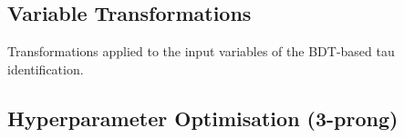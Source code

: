 \subsection{Variable Transformations}
\label{app:variable_transforms}

\begin{table}[htb]
  \centering
  {\def\arraystretch{1.35}\small
    
  }
  \caption[Transformations applied to input the variables of the BDT-based tau
  identification]{Transformations applied to the input variables of the
    BDT-based tau identification.}
\end{table}

\clearpage
\subsection{Hyperparameter Optimisation (3-prong)}
\label{app:grid_search_3p}

